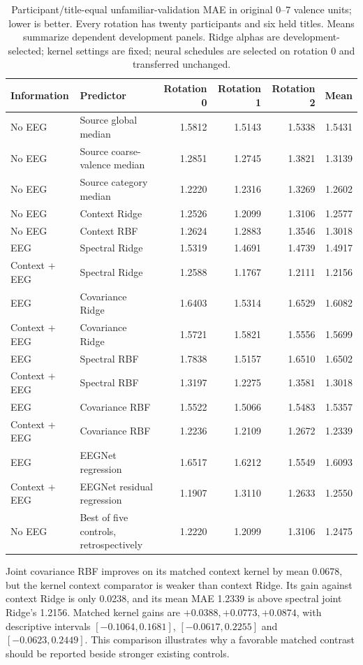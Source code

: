 \documentclass[conference]{IEEEtran}
\begin{document}
\begin{table}[t]
\centering
\caption{Participant/title-equal unfamiliar-validation MAE in original 0--7 valence units; lower is better. Every rotation has twenty participants and six held titles. Means summarize dependent development panels. Ridge alphas are development-selected; kernel settings are fixed; neural schedules are selected on rotation 0 and transferred unchanged.}
\label{tab:results}
\small
\begin{tabular}{llrrrr}
\toprule
Information & Predictor & Rotation 0 & Rotation 1 & Rotation 2 & Mean\\
\midrule
No EEG & Source global median & 1.5812 & 1.5143 & 1.5338 & 1.5431\\
No EEG & Source coarse-valence median & 1.2851 & 1.2745 & 1.3821 & 1.3139\\
No EEG & Source category median & 1.2220 & 1.2316 & 1.3269 & 1.2602\\
No EEG & Context Ridge & 1.2526 & 1.2099 & 1.3106 & 1.2577\\
No EEG & Context RBF & 1.2624 & 1.2883 & 1.3546 & 1.3018\\
\midrule
EEG & Spectral Ridge & 1.5319 & 1.4691 & 1.4739 & 1.4917\\
Context + EEG & Spectral Ridge & 1.2588 & 1.1767 & 1.2111 & 1.2156\\
EEG & Covariance Ridge & 1.6403 & 1.5314 & 1.6529 & 1.6082\\
Context + EEG & Covariance Ridge & 1.5721 & 1.5821 & 1.5556 & 1.5699\\
EEG & Spectral RBF & 1.7838 & 1.5157 & 1.6510 & 1.6502\\
Context + EEG & Spectral RBF & 1.3197 & 1.2275 & 1.3581 & 1.3018\\
EEG & Covariance RBF & 1.5522 & 1.5066 & 1.5483 & 1.5357\\
Context + EEG & Covariance RBF & 1.2236 & 1.2109 & 1.2672 & 1.2339\\
EEG & EEGNet regression & 1.6517 & 1.6212 & 1.5549 & 1.6093\\
Context + EEG & EEGNet residual regression & 1.1907 & 1.3110 & 1.2633 & 1.2550\\
\midrule
No EEG & Best of five controls, retrospectively & 1.2220 & 1.2099 & 1.3106 & 1.2475\\
\bottomrule
\end{tabular}
\end{table}

Joint covariance RBF improves on its matched context kernel by mean 0.0678, but the kernel context comparator is weaker than context Ridge. Its gain against context Ridge is only 0.0238, and its mean MAE 1.2339 is above spectral joint Ridge's 1.2156. Matched kernel gains are \(+0.0388,+0.0773,+0.0874\), with descriptive intervals \([-0.1064,0.1681]\), \([-0.0617,0.2255]\) and \([-0.0623,0.2449]\). This comparison illustrates why a favorable matched contrast should be reported beside stronger existing controls.
\end{document}

